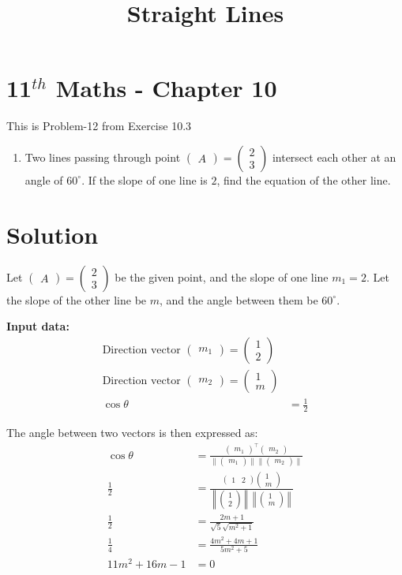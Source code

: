 \documentclass[10pt]{article}
\newcommand{\myvec}[1]{\ensuremath{\begin{pmatrix}#1\end{pmatrix}}}
\providecommand{\norm}[1]{\left\lVert#1\right\rVert}
\begin{document}
\title{\textbf{Straight Lines}}
\date{\vspace{-5ex}}
\maketitle

\section*{11$^{th}$ Maths - Chapter 10}
This is Problem-12 from Exercise 10.3

\begin{enumerate}
\item Two lines passing through point $\myvec{A} = \myvec{ 2 \\ 3 }$ intersect each other at an angle of $60^\circ$. If the slope of one line is $2$, find the equation of the other line.
\end{enumerate}

\section{Solution}

Let $\myvec{A} = \myvec{ 2 \\ 3 }$ be the given point, and the slope of one line $m_1 = 2$. Let the slope of the other line be $m$, and the angle between them be $60^\circ$.

\textbf{Input data:}
\begin{align}
\text{Direction vector } \myvec{m_1} =  \myvec{1 \\ 2}  \\
\text{Direction vector } \myvec{m_2} =  \myvec{1 \\ m}  \\
\cos \theta &= \frac{1}{2}
\end{align}

The angle between two vectors is then expressed as:
\begin{align}
\cos \theta &= \frac{\myvec{m_1}^\top \myvec{m_2}}{\|\myvec{m_1}\|\|\myvec{m_2}\|} \\
\frac{1}{2} &= \frac{\myvec{ 1 & 2} \myvec{ 1 \\ m} }{\norm{\myvec{ 1 \\ 2 }}\norm{\myvec{1 \\ m } }}\\
\frac{1}{2} &= \frac{2m + 1}{\sqrt{5} \sqrt{m^2 + 1}} \\
\frac{1}{4} &= \frac{4m^2 + 4m + 1}{5m^2 + 5} \\
11m^2 + 16m - 1 &= 0
\end{align}
\end{document}
